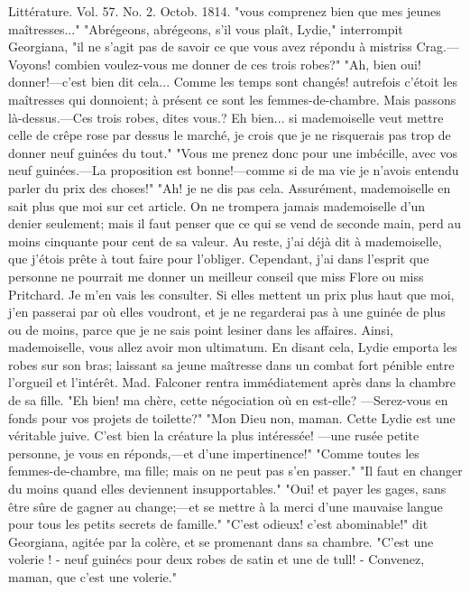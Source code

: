 Littérature. Vol. 57. No. 2. Octob. 1814. \setcounter{page}{270} "vous comprenez bien que mes jeunes maîtresses..."
"Abrégeons, abrégeons, s'il vous plaît, Lydie," interrompit Georgiana, "il ne s'agit pas de savoir ce que vous avez répondu à mistriss Crag.—Voyons! combien voulez-vous me donner de ces trois robes?"
"Ah, bien oui! donner!—c'est bien dit cela... Comme les temps sont changés! autrefois c'étoit les maîtresses qui donnoient; à présent ce sont les femmes-de-chambre. Mais passons là-dessus.—Ces trois robes, dites vous.? Eh bien... si mademoiselle veut mettre celle de crêpe rose par dessus le marché, je crois que je ne risquerais pas trop de donner neuf guinées du tout."
"Vous me prenez donc pour une imbécille, avec vos neuf guinées.—La proposition est bonne!—comme si de ma vie je n'avois entendu parler du prix des choses!"
"Ah! je ne dis pas cela. Assurément, mademoiselle en sait plus que moi sur cet article. On ne trompera jamais mademoiselle d'un denier seulement; mais il faut penser que ce qui se vend de seconde main, perd au moins cinquante pour cent de sa valeur. Au reste, j'ai déjà dit à mademoiselle, que j'étois prête à tout faire pour l'obliger. Cependant,\setcounter{page}{271} j'ai dans l'esprit que personne ne pourrait me donner un meilleur conseil que miss Flore ou miss Pritchard. Je m'en vais les consulter. Si elles mettent un prix plus haut que moi, j'en passerai par où elles voudront, et je ne regarderai pas à une guinée de plus ou de moins, parce que je ne sais point lesiner dans les affaires. Ainsi, mademoiselle, vous allez avoir mon ultimatum.
En disant cela, Lydie emporta les robes sur son bras; laissant sa jeune maîtresse dans un combat fort pénible entre l'orgueil et l'intérêt.
Mad. Falconer rentra immédiatement après dans la chambre de sa fille. "Eh bien! ma chère, cette négociation où en est-elle? —Serez-vous en fonds pour vos projets de toilette?"
"Mon Dieu non, maman. Cette Lydie est une véritable juive. C'est bien la créature la plus intéressée! —une rusée petite personne, je vous en réponds,—et d'une impertinence!"
"Comme toutes les femmes-de-chambre, ma fille; mais on ne peut pas s'en passer."
"Il faut en changer du moins quand elles deviennent insupportables."
"Oui! et payer les gages, sans être sûre de gagner au change;—et se mettre à la merci d'une mauvaise langue pour tous les petits secrets de famille."\setcounter{page}{272} "C’est odieux! c’est abominable!" dit Georgiana, agitée par la colère, et se promenant dans sa chambre. "C’est une volerie ! - neuf guinécs pour deux robes de satin et une de tull! - Convenez, maman, que c’est une volerie."
